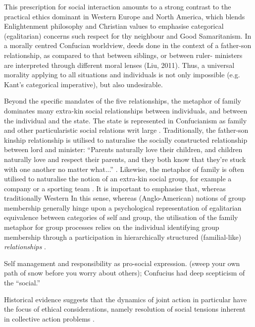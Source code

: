 {This prescription for social interaction amounts to a strong contrast to the practical ethics dominant in Western Europe and North America, which blends Enlightenment philosophy and Christian values to emphasise categorical (egalitarian) concerns such respect for thy neighbour and Good Samaritanism. In a morally centred Confucian worldview, deeds done in the context of a father-son relationship, as compared to that between siblings, or between ruler- ministers are interpreted through different moral lenses (Liu, 2011).  Thus, a universal morality applying to all situations and individuals is not only impossible (e.g. Kant’s categorical imperative), but also undesirable.

Beyond the specific mandates of the five relationships, the metaphor of family dominates many extra-kin social relationships between individuals, and between the individual and the state. The state is represented in Confucianism as family and other particularistic social relations writ large \citep[579]{Liu2009}.  Traditionally, the father-son kinship relationship is utilised to naturalise the socially constructed relationship between lord and minister: ``Parents naturally love their children, and children naturally love and respect their parents, and they both know that they're stuck with one another no matter what...'' \citep[178]{Slingerland2014}. Likewise, the metaphor of family is often utilised to naturalise the notion of an extra-kin social group, for example a company or a sporting team \citep{Brownell2008}.
It is important to emphasise that, whereas traditionally Western In this sense, whereas (Anglo-American) notions of group membership generally hinge upon a psychological representation of egalitarian equivalence between categories of self and group, the utilisation of the family metaphor for group processes relies on the individual identifying group membership through a participation in hierarchically structured (familial-like) \textit{relationships} \citep{Fei1992}.


Self management and responsibility as pro-social expression.  (sweep your own path of snow before you worry about others); Confucius had deep scepticism of the ``social.''


Historical evidence suggests that the dynamics of joint action in particular have the focus of ethical considerations, namely resolution of social tensions inherent in collective action problems \citep{Slingerland2014}.

}
